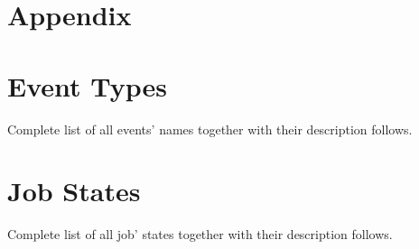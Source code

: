 \section*{Appendix}

\section{\LB Event Types}
\label{a:events}
Complete list of all events' names together with their description follows.


\newpage
\section{\LB Job States}
\label{a:jobstat}
Complete list of all job' states together with their description follows.




